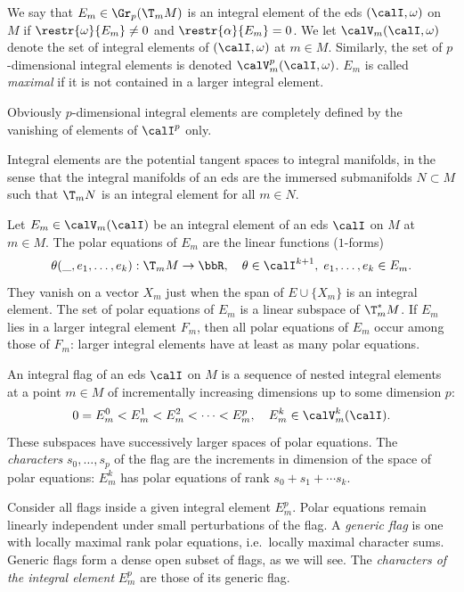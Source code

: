 \begin{defn}\label{def integral element}
    We say that $E_m\in \Gr_p(\T_m M)$ is an integral element of the \gls{eds} $(\calI,\omega)$ on $M$ if $\restr{\omega}{E_m}\neq 0$ and $\restr{\alpha}{E_m}=0$. We let $\calV_m(\calI,\omega)$ denote the set of integral elements of $(\calI,\omega)$ at $m\in M$. Similarly, the set of $p$-dimensional integral elements is denoted $\calV^p_m(\calI,\omega)$. $E_m$ is called \emph{maximal} if it is not contained in a larger integral element.
\end{defn}

Obviously  $p$-dimensional integral elements are completely defined by the vanishing of elements of $\calI^p$ only.

Integral elements are the potential tangent spaces to integral manifolds, in the sense that the integral manifolds of an \gls{eds} are the immersed submanifolds $N\subset M$ such that $\T_mN$ is an integral element for all $m\in N$.

\begin{defn}
    Let $E_m\in\calV_m(\calI)$ be an integral element of an \gls{eds} $\calI$ on $M$ at $m\in M$. The polar equations of $E_m$ are the linear functions ($1$-forms)
    \[ \theta(\_,e_1,\ldots,e_k): \T_mM\to \bbR,\quad \theta\in\calI^{k+1},\; e_1,\ldots,e_k\in E_m.\]
    They vanish on a vector $X_m$ just when the span of $E\cup \{X_m\}$ is an integral element. The set of polar equations of $E_m$ is a linear subspace of $\T_m^\ast M$. If $E_m$ lies in a larger integral element $F_m$, then all polar equations of $E_m$ occur among those of $F_m$: larger integral elements have at least as many polar equations.
\end{defn}

\begin{defn}
    An integral flag of an \gls{eds} $\calI$ on $M$ is a sequence of nested integral elements at a point $m\in M$ of incrementally increasing dimensions up to some dimension $p$:
    \[0=E^0_m< E^1_m< E^2_m< \cdots< E^p_m,\quad E^k_m\in\calV^k_m(\calI).\]
    These subspaces have successively larger spaces of polar equations. The \emph{characters} $s_0,\ldots,s_p$ of the flag are the increments in dimension of the space of polar equations: $E^k_m$ has polar equations of rank $s_0+s_1+\cdots s_k$.

    Consider all flags inside a given integral element $E^p_m$. Polar equations remain linearly independent under small perturbations of the flag. A \emph{generic flag} is one with locally maximal rank polar equations, i.e.\ locally maximal character sums. Generic flags form a dense open subset of flags, as we will see. The \emph{characters of the integral element} $E^p_m$ are those of its generic flag. 
\end{defn}

